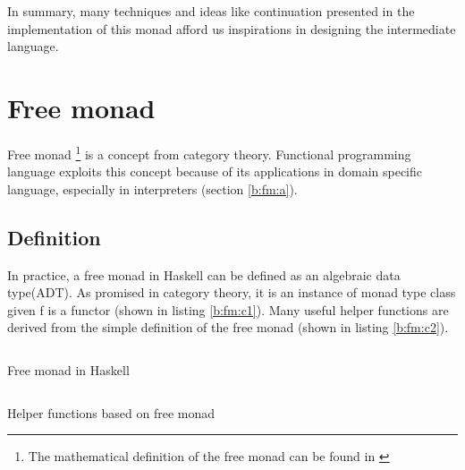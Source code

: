 In summary, many techniques and ideas like continuation presented in the implementation of this monad afford us inspirations in designing the intermediate language.
\section{Free monad} \label{b:fm}
Free monad \footnote{The mathematical definition of the free monad can be found in \cite{contributorsCatsFreeMonads}} is a concept from category theory.
Functional programming language exploits this concept because of its applications in domain specific language, especially in interpreters (section \ref{b:fm:a}).
\subsection{Definition}
In practice, a free monad in Haskell can be defined as an algebraic data type(ADT). As promised in category theory, it is an instance of monad type class given f is a functor (shown in listing \ref{b:fm:c1}). Many useful helper functions are derived from the simple definition of the free monad (shown in listing \ref{b:fm:c2}).
\begin{listing}[ht]
  \inputminted{haskell}{background/fm-construction.hs}
  \caption{Free monad in Haskell}
  \label{b:fm:c1}
\end{listing}
\begin{listing}[ht]
  \inputminted{haskell}{background/fm-helper.hs}
  \caption{Helper functions based on free monad}
  \label{b:fm:c2}
\end{listing}
